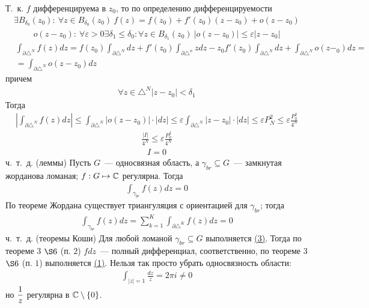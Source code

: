 Т.~к. $f$ дифференцируема в $z_0$, то по определению дифференцируемости
\begin{align*}
  \exists B_{\delta_0}(z_0): \ \forall z \in B_{\delta_0}(z_0) \ f(z) = f(z_0)+f'(z_0)(z-z_0) + o(z-z_0)
\end{align*}
\begin{align*}
  o(z-z_0): \ \forall \varepsilon > 0 \exists \delta_1 \leq \delta_0: \forall z \in B_{\delta_1}(z_0) \ \left| o(z-z_0) \right| \leq \varepsilon\left| z-z_0 \right|
\end{align*}
\begin{align*}
  & \int_{\partial \triangle^N}f(z)dz = f(z_0)\int_{\partial \triangle^N}dz+f'(z_0)\int_{\partial \triangle^n}zdz - z_0 f'(z_0)\int_{\partial \triangle^N} dz + \int_{\partial \triangle^N}o(z-_0)dz = \\
  & = \int_{\partial \triangle^N}o(z-z_0)dz
\end{align*}
причем
\begin{align*}
  \forall z \in \triangle^N \left| z-z_0 \right| < \delta_1
\end{align*}
Тогда
\begin{align*}
  \left| \int_{\partial \triangle^N}f(z)dz \right| \leq \int_{\partial \triangle^N} \left| o(z-z_0) \right|\cdot \left| dz \right| \leq \varepsilon\int_{\partial\triangle^N}\left| z-z_0 \right|\cdot\left| dz \right| \leq \varepsilon P^2_N \leq \varepsilon \frac{P^2_0}{4^N}
\end{align*}
\begin{align*}
  \frac{\left| I \right|}{4^N} \leq \varepsilon \frac{P^2_0}{4^N}
\end{align*}
\begin{align*}
  I = 0
\end{align*}
ч.~т.~д.
\corollary (леммы)
Пусть $G$~--- односвязная область, а $\gamma_{br} \subseteq
G$~--- замкнутая жорданова ломаная; $f:G \mapsto \mathbb{C}$ регулярна. \hypertarget{(3)}{Тогда}
\begin{align}
  \int_{\gamma_{br}} f(z)dz = 0
\end{align}
\pr
По теореме Жордана существует триангуляция с ориентацией для $\gamma_{br}$;
тогда 
\begin{align*}
  \int_{\gamma_{br}} f(z)dz = \sum_{k=1}^K\int_{\partial\triangle^K}f(z)dz = 0
\end{align*}
ч.~т.~д.
\pr (теоремы Коши)
Для любой ломаной $\gamma_{br}\subseteq G$ выполняется \hyperlink{(3)}{(3)}.
Тогда по теореме $3$ $\S 6$ (п. $2$) $f dz$~--- полный дифференциал,
соответственно, по теореме $3$ $\S 6$ (п. $1$) выполняется \hyperlink{(1)}{(1)}.
\note
Нельзя так просто убрать односвязность области:
\begin{align*}
  \int_{\left| z \right| = 1} \frac{dz}{z} = 2 \pi i \neq 0
\end{align*}
но $\displaystyle \frac{1}{z}$ регулярна в $\mathbb{C} \setminus \{0\}$.
